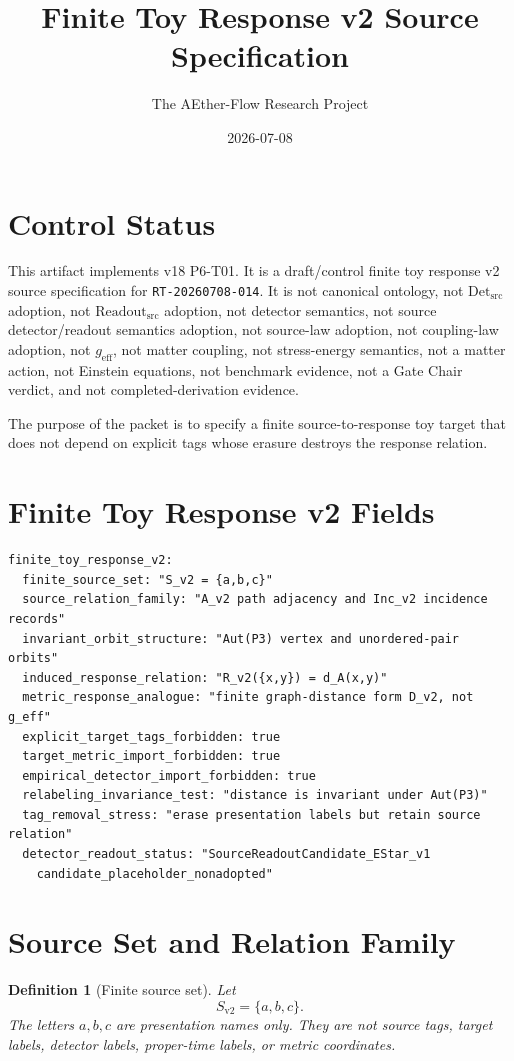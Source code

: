 \documentclass[11pt]{article}
\title{Finite Toy Response v2 Source Specification}
\author{The AEther-Flow Research Project}
\date{2026-07-08}
\newtheorem{definition}{Definition}
\newcommand{\Sv}{S_{\mathrm{v2}}}
\newcommand{\ReadoutSrc}{\mathrm{Readout}_{\mathrm{src}}}
\newcommand{\DetSrc}{\mathrm{Det}_{\mathrm{src}}}
\newcommand{\GEff}{g_{\mathrm{eff}}}
\begin{document}
\maketitle

\section*{Control Status}

This artifact implements v18 P6-T01. It is a draft/control finite toy
response v2 source specification for \texttt{RT-20260708-014}. It is not
canonical ontology, not \(\DetSrc\) adoption, not \(\ReadoutSrc\) adoption,
not detector semantics, not source detector/readout semantics adoption, not
source-law adoption, not coupling-law adoption, not \(\GEff\), not matter
coupling, not stress-energy semantics, not a matter action, not Einstein
equations, not benchmark evidence, not a Gate Chair verdict, and not
completed-derivation evidence.

The purpose of the packet is to specify a finite source-to-response toy target
that does not depend on explicit tags whose erasure destroys the response
relation.

\section{Finite Toy Response v2 Fields}

\begin{verbatim}
finite_toy_response_v2:
  finite_source_set: "S_v2 = {a,b,c}"
  source_relation_family: "A_v2 path adjacency and Inc_v2 incidence records"
  invariant_orbit_structure: "Aut(P3) vertex and unordered-pair orbits"
  induced_response_relation: "R_v2({x,y}) = d_A(x,y)"
  metric_response_analogue: "finite graph-distance form D_v2, not g_eff"
  explicit_target_tags_forbidden: true
  target_metric_import_forbidden: true
  empirical_detector_import_forbidden: true
  relabeling_invariance_test: "distance is invariant under Aut(P3)"
  tag_removal_stress: "erase presentation labels but retain source relation"
  detector_readout_status: "SourceReadoutCandidate_EStar_v1
    candidate_placeholder_nonadopted"
\end{verbatim}

\section{Source Set and Relation Family}

\begin{definition}[Finite source set]
Let
\[
  \Sv=\{a,b,c\}.
\]
The letters \(a,b,c\) are presentation names only. They are not source tags,
target labels, detector labels, proper-time labels, or metric coordinates.
\end{definition}
\end{document}
